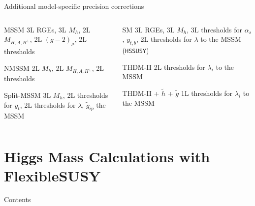 \documentclass[hyperref={pdfpagelabels=false},ngerman]{beamer}
\newcommand{\as}{\alpha_s}
\begin{document}
\begin{frame}{Additional model-specific precision corrections}
  \begin{columns}[T]
    \begin{column}{0.49\textwidth}
      \begin{modelblock}{MSSM}
        3L RGEs, 3L $M_h$, 2L $M_{H,A,H^\pm}$, 2L $(g-2)_\mu$, 2L
        thresholds
      \end{modelblock}
      \begin{modelblock}{NMSSM}
        2L $M_h$, 2L $M_{H,A,H^\pm}$, 2L thresholds
      \end{modelblock}
      \begin{modelblock}{Split-MSSM}
        3L $M_h$, 2L thresholds for $y_t$, 2L thresholds for $\lambda$, $\tilde{g}_{ip}$
        the MSSM
      \end{modelblock}
    \end{column}
    \begin{column}{0.49\textwidth}
      \begin{modelblock}{SM}
        3L RGEs, 3L $M_h$, 3L thresholds for $\as$, $y_{t,b}$, 2L
        thresholds for $\lambda$ to the MSSM (\texttt{HSSUSY})
      \end{modelblock}
      \begin{modelblock}{THDM-II}
        2L thresholds for $\lambda_i$ to the MSSM
      \end{modelblock}
      \begin{modelblock}{THDM-II + $\tilde{h}$ + $\tilde{g}$}
        1L thresholds for $\lambda_i$ to the MSSM
      \end{modelblock}
    \end{column}
  \end{columns}
\end{frame}


\section{Higgs Mass Calculations with FlexibleSUSY}

\begin{frame}{Contents}
  \tableofcontents[currentsection]  
\end{frame}
\end{document}
